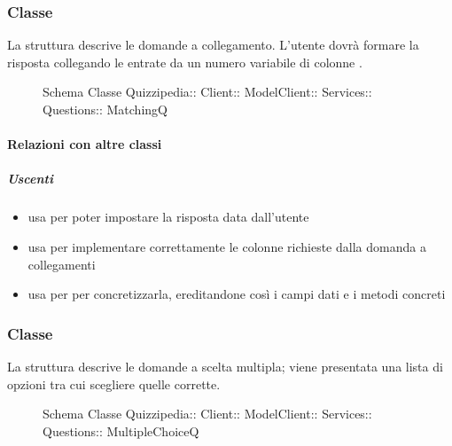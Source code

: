 \subsubsection{Classe }
La struttura descrive le domande a collegamento. L'utente dovrà formare la risposta collegando le entrate da un numero variabile di colonne .
\begin{figure}[H]
\centering
\noindent{}
\caption[Schema Classe MatchingQ]{Schema Classe Quizzipedia:: Client:: ModelClient:: Services:: Questions:: MatchingQ}
\end{figure}
\paragraph{Relazioni con altre classi}
\subparagraph{Uscenti}
\begin{itemize}
\item usa  per poter impostare la risposta data dall'utente
\item usa  per implementare correttamente le colonne richieste dalla domanda a collegamenti
\item usa  per per concretizzarla, ereditandone così i campi dati e i metodi concreti
\end{itemize}
\subsubsection{Classe }
La struttura descrive le domande a scelta multipla; viene presentata una lista di opzioni tra cui scegliere quelle corrette.
\begin{figure}[H]
\centering
\noindent{}
\caption[Schema Classe MultipleChoiceQ]{Schema Classe Quizzipedia:: Client:: ModelClient:: Services:: Questions:: MultipleChoiceQ}
\end{figure}
